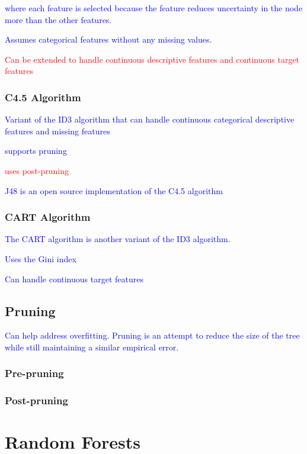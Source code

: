 \textcolor{blue}{where each feature is selected because the feature reduces uncertainty in the node more than the other features.}

\textcolor{blue}{Assumes categorical features without any missing values.}

\textcolor{red}{Can be extended to handle continuous descriptive features and continuous target features}

\subsubsection{C4.5 Algorithm}

\textcolor{blue}{Variant of the {ID3 algorithm} that can handle continuous categorical descriptive features and missing features}

\textcolor{blue}{supports pruning}

\textcolor{red}{uses post-pruning}

\textcolor{blue}{{J48} is an open source implementation of the C4.5 algorithm}

\subsubsection{CART Algorithm}

\textcolor{blue}{The CART algorithm is another variant of the ID3 algorithm.}

\textcolor{blue}{Uses the Gini index}

\textcolor{blue}{Can handle continuous target features}

\subsection{Pruning}

\textcolor{blue}{Can help address overfitting. Pruning is an attempt to reduce the size of the tree while still maintaining a similar empirical error.}

\subsubsection{Pre-pruning}

\subsubsection{Post-pruning}

\section{Random Forests}


